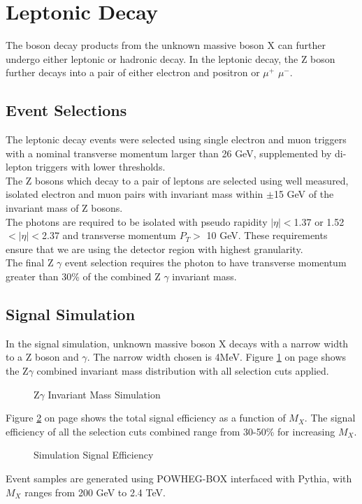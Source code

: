 \documentclass[12pt]{article}
\begin{document}
\section{Leptonic Decay}
The boson decay products from the unknown massive boson X can further undergo either leptonic or hadronic decay. In the leptonic decay, the Z boson further decays into a pair of either electron and positron or $\mu^+$ $\mu^-$.
\subsection{Event Selections}
The leptonic decay events were selected using single electron and muon triggers with a nominal transverse momentum larger than 26 GeV, supplemented by di-lepton triggers with lower thresholds.\\
The Z bosons which decay to a pair of leptons are selected using well measured, isolated electron and muon pairs with invariant mass within $\pm$15 GeV of the invariant mass of Z bosons.\\
The photons are required to be isolated with pseudo rapidity $|\eta|<$1.37 or 1.52$<|\eta|<$2.37 and transverse momentum $P_T>$ 10 GeV. These requirements ensure that we are using the detector region with highest granularity.\\
The final Z $\gamma$ event selection requires the photon to have transverse momentum greater than 30\% of the combined Z $\gamma$ invariant mass.
\subsection{Signal Simulation}
In the signal simulation, unknown massive boson X decays with a narrow width to a Z boson and $\gamma$. The narrow width chosen is 4MeV. Figure \ref{signal-simulation} on page \pageref{signal-simulation} shows the Z$\gamma$ combined invariant mass distribution with all selection cuts applied.\\
\begin{figure}[H]
\begin{center}
\caption[Caption for LOF]{Z$\gamma$ Invariant Mass Simulation}
\label{signal-simulation}
\end{center}
\end{figure}
Figure \ref{signal-efficiency} on page \pageref{signal-efficiency} shows the total signal efficiency as a function of $M_X$. The signal efficiency of all the selection cuts combined range from 30-50\% for increasing $M_X$.\\
\begin{figure}[H]
\begin{center}
\caption[Caption for LOF]{Simulation Signal Efficiency}
\label{signal-efficiency}
\end{center}
\end{figure}
Event samples are generated using POWHEG-BOX interfaced with Pythia, with $M_X$ ranges from 200 GeV to 2.4 TeV. 
\end{document}
